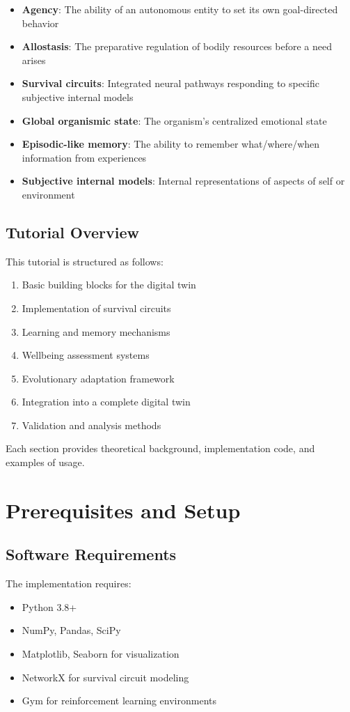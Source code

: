 \documentclass[11pt,a4paper]{article}
\begin{document}
\begin{itemize}
    \item \textbf{Agency}: The ability of an autonomous entity to set its own goal-directed behavior
    \item \textbf{Allostasis}: The preparative regulation of bodily resources before a need arises
    \item \textbf{Survival circuits}: Integrated neural pathways responding to specific subjective internal models
    \item \textbf{Global organismic state}: The organism's centralized emotional state
    \item \textbf{Episodic-like memory}: The ability to remember what/where/when information from experiences
    \item \textbf{Subjective internal models}: Internal representations of aspects of self or environment
\end{itemize}

\subsection{Tutorial Overview}
This tutorial is structured as follows:
\begin{enumerate}
    \item Basic building blocks for the digital twin
    \item Implementation of survival circuits
    \item Learning and memory mechanisms
    \item Wellbeing assessment systems
    \item Evolutionary adaptation framework
    \item Integration into a complete digital twin
    \item Validation and analysis methods
\end{enumerate}

Each section provides theoretical background, implementation code, and examples of usage.

\section{Prerequisites and Setup}
\subsection{Software Requirements}
The implementation requires:
\begin{itemize}
    \item Python 3.8+
    \item NumPy, Pandas, SciPy
    \item Matplotlib, Seaborn for visualization
    \item NetworkX for survival circuit modeling
    \item Gym for reinforcement learning environments
\end{itemize}
\end{document}
